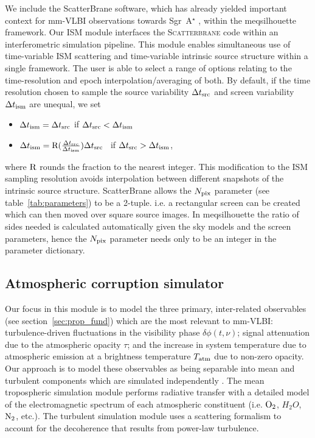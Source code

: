 We include the {\sc ScatterBrane} software, which has already yielded important context for mm-VLBI observations towards Sgr~A$^\star$ \citep[e.g.][]{Ortiz_2016}, within the {\sc meqsilhouette} framework. Our ISM module interfaces the \textsc{Scatterbrane} code within an interferometric simulation pipeline. This module enables simultaneous use of time-variable ISM scattering and time-variable intrinsic source structure within a single framework. The user is able to select a range of options relating to the time-resolution and epoch interpolation/averaging of both. By default, if the time resolution chosen to sample the source variability $\Delta t_{\rm src}$ and screen variability $\Delta t_{\rm ism}$ are unequal, we set  
\begin{itemize}
 \setlength\itemsep{1em}
\item $\Delta t_{\rm ism}=\Delta t_{\rm src}$ \qquad \qquad if \qquad  $\Delta t_{\rm src} < \Delta t_{\rm ism}$
\item $\Delta t_{\rm ism}={\rm R}(\frac{\Delta t_{\rm src}}{\Delta t_{\rm ism}})\Delta t_{\rm src}$ \ if \qquad  $\Delta t_{\rm src} > \Delta t_{\rm ism}$,
\end{itemize}
where ${\rm R}$ rounds the fraction to the nearest integer.  This modification to the ISM sampling resolution avoids interpolation between different snapshots of the intrinsic source structure.  {\sc ScatterBrane} allows the $N_{\rm pix}$ parameter (see table~\ref{tab:parameters}) to be a 2-tuple. i.e. a rectangular screen can be created which can then moved over square source images. In {\sc meqsilhouette} the ratio of sides needed is calculated automatically given the sky models and the screen parameters, hence the $N_{\rm pix}$ parameter needs only to be an integer in the parameter dictionary. 


\subsection{Atmospheric corruption simulator}\label{sec:trop_imp}

Our focus in this module is to model the three primary, inter-related observables (see section~\ref{sec:prop_fund}) which are the most relevant to mm-VLBI: turbulence-driven fluctuations in the visibility phase $\delta \phi(t,\nu)$; signal attenuation due to the atmospheric opacity $\tau$; and the increase in system temperature due to atmospheric emission at a brightness temperature $T_{\rm atm}$ due to non-zero opacity. Our approach is to model these observables as being separable into mean and turbulent components which are simulated independently \citep{Blecher_2016}. The mean tropospheric simulation module performs radiative transfer with a detailed model of the electromagnetic spectrum of each atmospheric constituent (i.e. ${\rm O_2}$, {\rm $H_2O$}, ${\rm N_2}$, etc.). The turbulent simulation module uses a scattering formalism to account for the decoherence that results from power-law turbulence.

